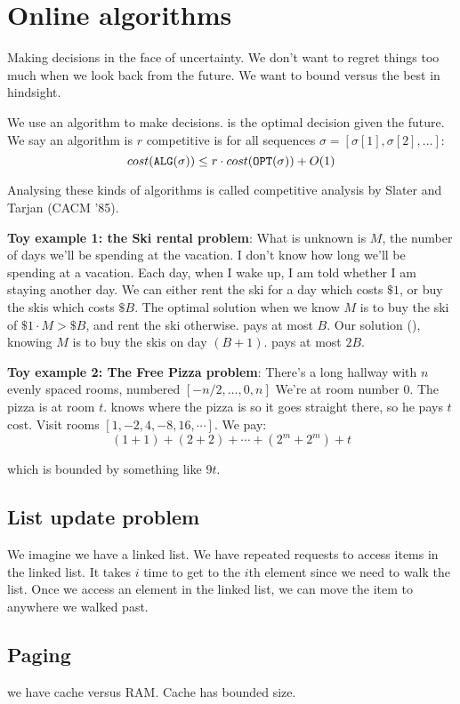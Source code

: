 \chapter{Online algorithms}

Making decisions in the face of uncertainty. We don't want to regret things
too much when we look back from the future. We want to bound versus the
best in hindsight.


We use an algorithm \ALG to make decisions. \OPT is the optimal decision
given the future. We say an algorithm is $r$ competitive is for all sequences
$\sigma = [\sigma[1], \sigma[2], \dots]$:
$$cost(\texttt{ALG}(\sigma)) \leq r \cdot cost(\texttt{OPT}(\sigma)) + O(1)$$

Analysing these kinds of algorithms is called competitive analysis by Slater
and Tarjan (CACM '85).


\textbf{Toy example 1:  the Ski rental problem}: What is unknown is $M$, the number
of days we'll be spending at the vacation. I don't know how long we'll be spending at a vacation. Each
day, when I wake up, I am told whether I am staying another day.
We can either rent the ski for a day which costs $\$1$, or buy the skis which costs $\$B$.
The optimal solution when we know $M$ is to buy the ski of $\$1 \cdot M > \$ B$, and
rent the ski otherwise. \OPT pays at most $B$.
Our solution (\ALG), knowing $M$ is to buy the skis on day $(B+1)$. \ALG pays
at most $2B$.

\textbf{Toy example 2: The Free Pizza problem}:
There's a long hallway with $n$ evenly spaced rooms, numbered $[-n/2, \dots, 0, n]$
We're at room number $0$. The pizza is at room $t$.
\OPT knows where the pizza is so it goes straight there, so he pays $t$ cost.
Visit rooms $[1, -2, 4, -8, 16, \cdots]$. We pay:
$$
(1 + 1) + (2 + 2) + \cdots + (2^m + 2^m) + t
$$

which is bounded by something like $9t$.

\section{List update problem}

We imagine we have a linked list. We have repeated requests to access items
in the linked list. It takes $i$ time to get to the $i$th element since
we need to walk the list. Once we access an element in the linked list, we can
move the item to anywhere we walked past.

\section{Paging}
we have cache versus RAM. Cache has bounded size.


